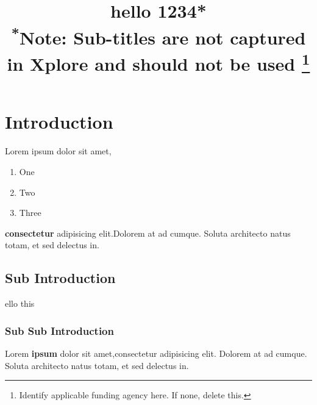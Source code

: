 \documentclass[conference]{IEEEtran}%
\begin{document}
%
\normalsize%
\title{hello 1234*\\
{\footnotesize \textsuperscript{*}Note: Sub-titles are not captured in Xplore and should not be used}
\thanks{Identify applicable funding agency here. If none, delete this.}
}%
\author{
\and
{}
\and
{}
\and
{}
}%
\maketitle%
\section{Introduction}%
\label{sec:Introduction}%
Lorem ipsum dolor sit amet, \begin{enumerate}\item One\item Two\item Three\end{enumerate} \textbf{consectetur} adipisicing elit.Dolorem at ad cumque. Soluta architecto natus totam, \cite{Sample2024} et sed delectus in.%
\subsection{Sub Introduction}%
\label{subsec:SubIntroduction}%
ello this%
\subsubsection{Sub Sub Introduction}%
\label{ssubsec:SubSubIntroduction}%
Lorem \textbf{ipsum} dolor sit amet,consectetur adipisicing elit. Dolorem at ad cumque. Soluta architecto natus totam, et sed delectus in.

%
\end{document}

